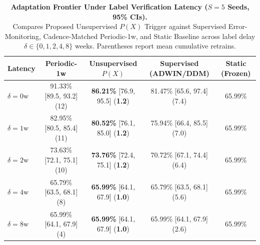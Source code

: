 \begin{table}[t]
\centering
\caption{\textbf{Adaptation Frontier Under Label Verification Latency ($S=5$ Seeds, 95\% CIs).}\\Compares Proposed Unsupervised $P(X)$ Trigger against Supervised Error-Monitoring, Cadence-Matched Periodic-1w, and Static Baseline across label delay $\delta \in \{0, 1, 2, 4, 8\}$ weeks. Parentheses report mean cumulative retrains.}
\label{tab:label_delay_adaptation_frontier}
\small
\begin{tabularx}{0.48\textwidth}{l c c c c}
\toprule
\textbf{Latency} & \textbf{Periodic-1w} & \textbf{Unsupervised $P(X)$} & \textbf{Supervised (ADWIN/DDM)} & \textbf{Static (Frozen)} \\
\midrule
$\delta = 0\text{w}$ & 91.33\% [89.5, 93.2] (12) & \textbf{86.21\%} [76.9, 95.5] (\textbf{1.2}) & 81.47\% [65.6, 97.4] (7.4) & 65.99\% \\
$\delta = 1\text{w}$ & 82.95\% [80.5, 85.4] (11) & \textbf{80.52\%} [76.1, 85.0] (\textbf{1.2}) & 75.94\% [66.4, 85.5] (7.0) & 65.99\% \\
$\delta = 2\text{w}$ & 73.63\% [72.1, 75.1] (10) & \textbf{73.76\%} [72.4, 75.1] (\textbf{1.2}) & 70.72\% [67.1, 74.4] (6.4) & 65.99\% \\
$\delta = 4\text{w}$ & 65.79\% [63.5, 68.1] (8) & \textbf{65.99\%} [64.1, 67.9] (\textbf{1.0}) & 65.79\% [63.5, 68.1] (5.6) & 65.99\% \\
$\delta = 8\text{w}$ & 65.99\% [64.1, 67.9] (4) & \textbf{65.99\%} [64.1, 67.9] (\textbf{1.0}) & 65.99\% [64.1, 67.9] (2.6) & 65.99\% \\
\bottomrule
\end{tabularx}
\end{table}
